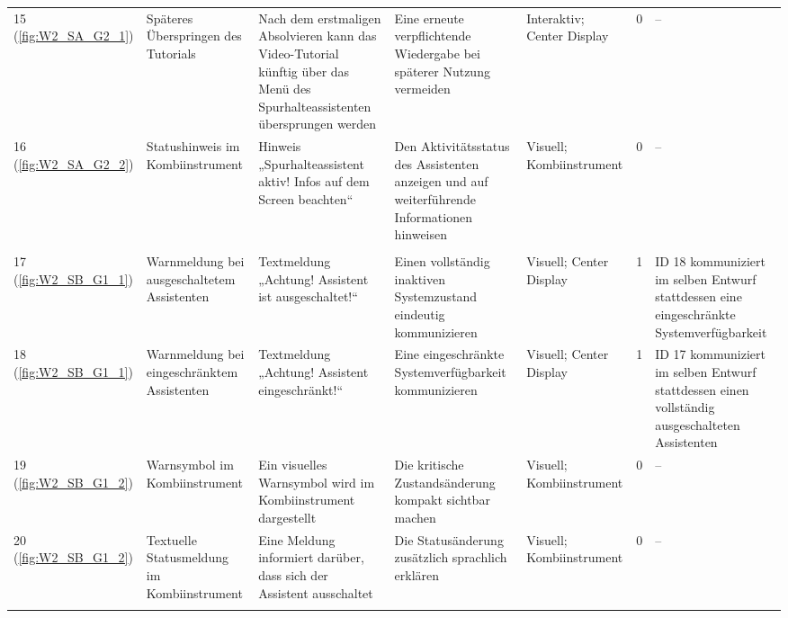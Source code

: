 {\begin{xltabular}{\textwidth}{
    P{0.65cm}
    Y
    Y
    Y
    P{1.75cm}
    P{1.25cm}
    Y
}
\rowrule

15 (\ref{fig:W2_SA_G2_1}) &
Späteres Überspringen des Tutorials &
Nach dem erstmaligen Absolvieren kann das Video-Tutorial künftig über das Menü des Spurhalteassistenten übersprungen werden &
Eine erneute verpflichtende Wiedergabe bei späterer Nutzung vermeiden &
Interaktiv; Center Display &
0 &
--
\\

\rowrule

16 (\ref{fig:W2_SA_G2_2}) &
Statushinweis im Kombiinstrument &
Hinweis „Spurhalteassistent aktiv! Infos auf dem Screen beachten“ &
Den Aktivitätsstatus des Assistenten anzeigen und auf weiterführende Informationen hinweisen &
Visuell; Kombiinstrument &
0 &
--
\\

\rowrule
{}
\\
\rowrule

17 (\ref{fig:W2_SB_G1_1}) &
Warnmeldung bei ausgeschaltetem Assistenten &
Textmeldung „Achtung! Assistent ist ausgeschaltet!“ &
Einen vollständig inaktiven Systemzustand eindeutig kommunizieren &
Visuell; Center Display &
1 &
ID 18 kommuniziert im selben Entwurf stattdessen eine eingeschränkte Systemverfügbarkeit
\\

\rowrule

18 (\ref{fig:W2_SB_G1_1}) &
Warnmeldung bei eingeschränktem Assistenten &
Textmeldung „Achtung! Assistent eingeschränkt!“ &
Eine eingeschränkte Systemverfügbarkeit kommunizieren &
Visuell; Center Display &
1 &
ID 17 kommuniziert im selben Entwurf stattdessen einen vollständig ausgeschalteten Assistenten
\\

\rowrule

19 (\ref{fig:W2_SB_G1_2}) &
Warnsymbol im Kombiinstrument &
Ein visuelles Warnsymbol wird im Kombiinstrument dargestellt &
Die kritische Zustandsänderung kompakt sichtbar machen &
Visuell; Kombiinstrument &
0 &
--
\\

\rowrule

20 (\ref{fig:W2_SB_G1_2}) &
Textuelle Statusmeldung im Kombiinstrument &
Eine Meldung informiert darüber, dass sich der Assistent ausschaltet &
Die Statusänderung zusätzlich sprachlich erklären &
Visuell; Kombiinstrument &
0 &
--
\\

\rowrule


\end{xltabular}}
